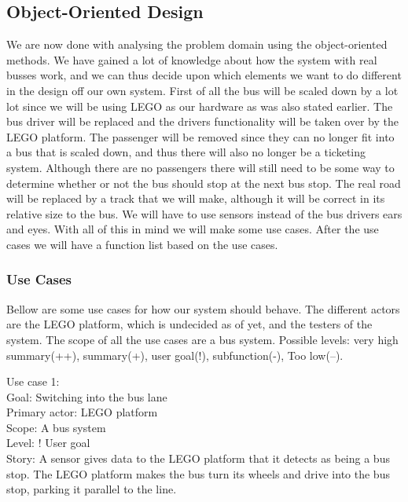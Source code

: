 \subsection{Object-Oriented Design}


We are now done with analysing the problem domain using the object-oriented methods. We have gained a lot of knowledge about how the system with real busses work, and we can thus decide upon which elements we want to do different in the design off our own system.
First of all the bus will be scaled down by a lot lot since we will be using LEGO as our hardware as was also stated earlier. The bus driver will be replaced and the drivers functionality will be taken over by the LEGO platform.
The passenger will be removed since  they can no longer fit into a bus that is scaled down, and thus there will also no longer be a ticketing system.
Although there are no passengers there will still need to be some way to determine whether or not the bus should stop at the next bus stop.
The real road will be replaced by a track that we will make, although it will be correct in its relative size to the bus.
We will have to use sensors instead of the bus drivers ears and eyes.
With all of this in mind we will make some use cases. After the use cases we will have a function list based on the use cases.


\subsubsection{Use Cases}
Bellow are some use cases for how our system should behave. The different actors are the LEGO platform, which is undecided as of yet, and the testers of the system. The scope of all the use cases are a bus system.  Possible levels: very high summary(++), summary(+), user goal(!), subfunction(-), Too low(--).

Use case 1:\\
Goal: Switching into the bus lane\\
Primary actor: LEGO platform\\
Scope: A bus system\\
Level: ! User goal\\
Story: A sensor gives data to the LEGO platform that it detects as being a bus stop. The LEGO platform makes the bus turn its wheels and drive into the bus stop, parking it parallel to the line.

